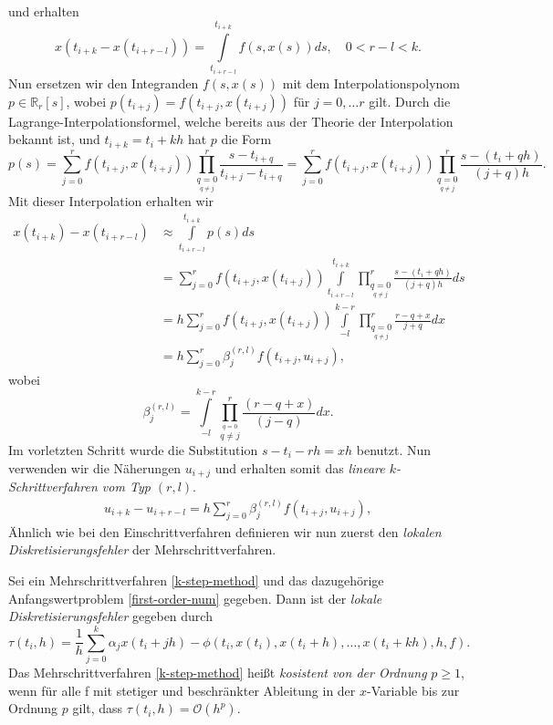 und erhalten
\[
    x(t_{i+k} - x(t_{i+r-l})) = \int\limits_{t_{i+r-l}}^{t_{i+k}} f(s,x(s)) ds, \quad 0<r-l<k.
\]
Nun ersetzen wir den Integranden $f(s,x(s))$ mit dem Interpolationspolynom $p \in \mathbb{R}_r[s]$, wobei
$p(t_{i+j})=f(t_{i+j},x(t_{i+j}))$ für $j=0, \dots r$ gilt. Durch die Lagrange-Interpolationsformel, welche bereits aus
der Theorie der Interpolation bekannt ist, und $t_{i+k}=t_i+kh$ hat $p$ die Form
\[
    p(s)=\sum_{j=0}^{r}f(t_{i+j},x(t_{i+j})) \prod\limits_{\underset{q \neq j}{q=0}}^{r} \frac{s-t_{i+q}}{t_{i+j}-t_{i+q}}
    =\sum_{j=0}^{r}f(t_{i+j},x(t_{i+j})) \prod\limits_{\underset{q \neq j}{q=0}}^{r} \frac{s-(t_i+qh)}{(j+q)h}.
\]
Mit dieser Interpolation erhalten wir
\begin{align*}
    x(t_{i+k}) - x(t_{i+r-l}) &\approx \int\limits_{t_{i+r-l}}^{t_{i+k}} p(s) ds \\
    &=\sum_{j=0}^{r}f(t_{i+j},x(t_{i+j})) \int\limits_{t_{i+r-l}}^{t_{i+k}}
    \prod\limits_{\underset{q \neq j}{q=0}}^{r} \frac{s-(t_i+qh)}{(j+q)h} ds \\
    &= h \sum_{j=0}^{r}f(t_{i+j},x(t_{i+j})) \int\limits_{-l}^{k-r}
    \prod\limits_{\underset{q \neq j}{q=0}}^{r} \frac{r-q+x}{j+q} dx\\
    &=h \sum_{j=0}^{r} \beta_j^{(r,l)} f(t_{i+j},u_{i+j}),
\end{align*}
wobei
\[
    \beta_j^{(r,l)} = \int\limits_{-l}^{k-r} \prod\limits_{\overset{q=0}{q \neq j}}^{r} \frac{(r-q+x)}{(j-q)}dx.
\]
Im vorletzten Schritt wurde die Substitution $s-t_i-rh = xh$ benutzt. Nun verwenden wir die Näherungen $u_{i+j}$ und
erhalten somit das \textit{lineare $k$-Schrittverfahren vom Typ $(r,l)$}.
\begin{align}
    \label{k-step-rl}
    u_{i+k}-u_{i+r-l} = h \sum_{j=0}^{r} \beta_j^{(r,l)} f(t_{i+j},u_{i+j}),
\end{align}
Ähnlich wie bei den Einschrittverfahren definieren wir nun zuerst den {\em lokalen Diskretisierungsfehler} der
Mehrschrittverfahren.
\begin{definition}
    Sei ein Mehrschrittverfahren \eqref{k-step-method} und das dazugehörige Anfangswertproblem \eqref{first-order-num}
    gegeben. Dann ist der {\em lokale Diskretisierungsfehler} gegeben durch
    \[
        \tau(t_i,h) = \frac{1}{h} \sum_{j=0}^{k} \alpha_j x(t_i + jh) -
        \phi (t_i,x(t_i), x(t_i+h), \dots, x(t_i+kh),h,f).
    \]
    Das Mehrschrittverfahren \eqref{k-step-method} heißt {\em kosistent von der Ordnung} $p\geq 1$, wenn für alle f mit
    stetiger und beschränkter Ableitung in der $x$-Variable bis zur Ordnung $p$ gilt, dass
    $\tau(t_i,h) = \mathcal{O}(h^p)$.
\end{definition}
